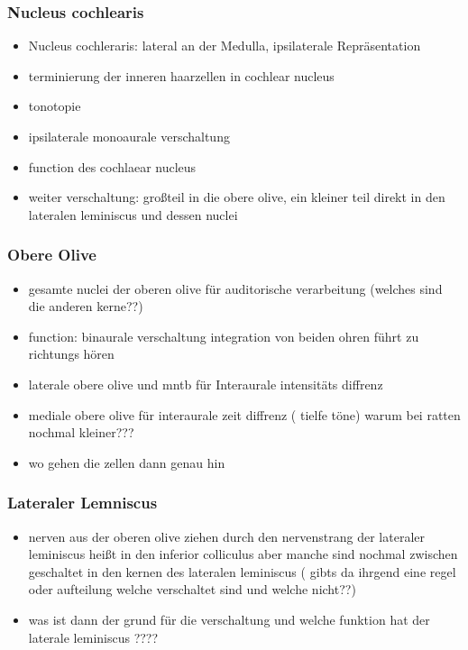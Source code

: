 \documentclass[12pt,a4paper,pdftex]{article}
\begin{document}
\subsubsection*{Nucleus cochlearis}
   
\begin{itemize}
 \item Nucleus cochleraris: lateral an der Medulla, ipsilaterale Repräsentation
    \item terminierung der inneren haarzellen in cochlear nucleus 
    \item tonotopie 
    \item ipsilaterale monoaurale verschaltung
    \item function des cochlaear nucleus
    \item weiter verschaltung: großteil in die obere olive, ein kleiner teil direkt in den lateralen leminiscus und dessen nuclei 
\end{itemize}


\subsubsection*{Obere Olive}
    \begin{itemize}
        \item gesamte nuclei der oberen olive für auditorische verarbeitung (welches sind die anderen kerne??)
        \item function: binaurale verschaltung integration von beiden ohren führt zu richtungs hören
        \item laterale obere olive und mntb für Interaurale intensitäts diffrenz
        \item mediale obere olive für interaurale zeit diffrenz ( tielfe töne) warum bei ratten nochmal kleiner???
        \item wo gehen die zellen dann genau hin
    \end{itemize}


\subsubsection*{Lateraler Lemniscus}
    \begin{itemize}
        \item nerven aus der oberen olive ziehen durch den nervenstrang der lateraler leminiscus heißt in den inferior colliculus aber manche sind nochmal zwischen geschaltet in den kernen des lateralen leminiscus ( gibts da ihrgend eine regel oder aufteilung welche verschaltet sind und welche nicht??)
        \item was ist dann der grund für die verschaltung und welche funktion hat der laterale leminiscus ????
    \end{itemize}
\end{document}

